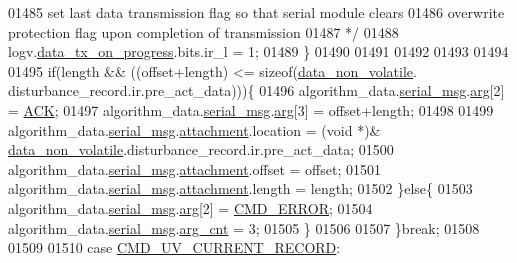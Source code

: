 \begin{DoxyCode}
{{{{{01485 \textcolor{comment}{                         set last data transmission flag so that serial module clears}
01486 \textcolor{comment}{                         overwrite protection flag upon completion of transmission}
01487 \textcolor{comment}{                       */}
01488                         logv.\hyperlink{a00021_a6cdefde69642ef511e3252c38be68516}{data\_tx\_on\_progress}.bits.ir\_l = 1;
01489                     \}
01490 
01491 
01492 
01493 
01494 
01495                    \textcolor{keywordflow}{if}(length && ((offset+length) <= \textcolor{keyword}{sizeof}(\hyperlink{a00060_a76ac5f917f5308dcd83de0d7c94559fb}{data\_non\_volatile}.
      disturbance\_record.ir.pre\_act\_data)))\{
01496                        algorithm\_data.\hyperlink{a00016_afcf5f557aea688aad985eec15269c1da}{serial\_msg}.\hyperlink{a00031_af7d6f762438c80072bd9dc0e4dd4ae1e}{arg}[2]                 = 
      \hyperlink{a00021_a6f6489887e08bff4887d0bc5dcf214d8}{ACK};
01497                        algorithm\_data.\hyperlink{a00016_afcf5f557aea688aad985eec15269c1da}{serial\_msg}.\hyperlink{a00031_af7d6f762438c80072bd9dc0e4dd4ae1e}{arg}[3]                 = offset+length;
01498 
01499                        algorithm\_data.\hyperlink{a00016_afcf5f557aea688aad985eec15269c1da}{serial\_msg}.\hyperlink{a00031_a040f6d5d58d18d8aeaf447eda7f50172}{attachment}.location    = (\textcolor{keywordtype}{void} *)&
      \hyperlink{a00060_a76ac5f917f5308dcd83de0d7c94559fb}{data\_non\_volatile}.disturbance\_record.ir.pre\_act\_data;
01500                        algorithm\_data.\hyperlink{a00016_afcf5f557aea688aad985eec15269c1da}{serial\_msg}.\hyperlink{a00031_a040f6d5d58d18d8aeaf447eda7f50172}{attachment}.offset      = offset;
01501                        algorithm\_data.\hyperlink{a00016_afcf5f557aea688aad985eec15269c1da}{serial\_msg}.\hyperlink{a00031_a040f6d5d58d18d8aeaf447eda7f50172}{attachment}.length      = length;
01502                      \}\textcolor{keywordflow}{else}\{
01503                          algorithm\_data.\hyperlink{a00016_afcf5f557aea688aad985eec15269c1da}{serial\_msg}.\hyperlink{a00031_af7d6f762438c80072bd9dc0e4dd4ae1e}{arg}[2]               = 
      \hyperlink{a00021_a1764a522e9c1a59a59be8757c69fa494}{CMD\_ERROR};
01504                          algorithm\_data.\hyperlink{a00016_afcf5f557aea688aad985eec15269c1da}{serial\_msg}.\hyperlink{a00031_a7b79f40e2eeec288091afd340bf8f591}{arg\_cnt}              = 3;
01505                      \}
01506 
01507                 \}\textcolor{keywordflow}{break};
01508 
01509 
01510                  \textcolor{keywordflow}{case}  \hyperlink{a00021_ab0e0364ddc2d95d1e5b51a3e3ff50918}{CMD\_UV\_CURRENT\_RECORD}:
}}}}}
\end{DoxyCode}
